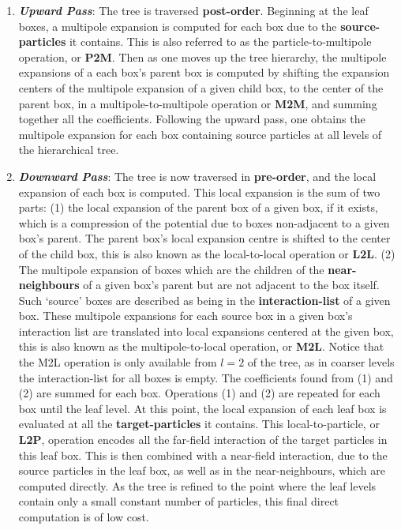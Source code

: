 \begin{enumerate}
    \item \textbf{\textit{Upward Pass}}: The tree is traversed \textbf{\gls{post-order}}.
    Beginning at the leaf boxes, a multipole expansion is computed for each box
    due to the \textbf{\gls{source-particles}} it contains. This is also referred to as the particle-to-multipole
    operation, or \textbf{\gls{P2M}}. Then as one moves up the tree hierarchy, the
    multipole expansions of a each box's parent box is computed by shifting the
    expansion centers of the multipole expansion of a given child box, to the center
    of the parent box, in a multipole-to-multipole operation or \textbf{\gls{M2M}},
    and summing together all the coefficients. Following the upward pass, one
    obtains the multipole expansion for each box containing source particles at
    all levels of the hierarchical tree.
    \item \textbf{\textit{Downward Pass}}: The tree is now traversed in
    \textbf{\gls{pre-order}}, and the local expansion of each box is computed.
    This local expansion is the sum of two parts: (1) the local expansion of the
    parent box of a given box, if it exists, which is a compression of the potential due to boxes
    non-adjacent to a given box's parent. The parent box's local expansion centre
    is shifted to the center of the child box, this is also known as the local-to-local
    operation or \textbf{\gls{L2L}}. (2) The multipole expansion of boxes which
    are the children of the \textbf{\gls{near-neighbours}} of a given box's
    parent but are not adjacent to the box itself. Such `source' boxes are described
    as being in the \textbf{\gls{interaction-list}} of a given box. These multipole
    expansions for each source box in a given box's interaction list are translated into local expansions centered at
    the given box, this is also known as
    the multipole-to-local operation, or \textbf{\gls{M2L}}. Notice that the
    \gls{M2L} operation is only available from $l=2$ of the tree, as in coarser
    levels the \gls{interaction-list} for all boxes is empty. The coefficients found
    from (1) and (2) are summed for each box. Operations (1) and (2) are repeated for each
    box until the leaf level. At this point, the local expansion
    of each leaf box is evaluated at all the \textbf{\gls{target-particles}} it contains.
    This local-to-particle, or \textbf{\gls{L2P}}, operation encodes all the \gls{far-field}
    interaction of the target particles in this leaf box. This is then combined with
    a \gls{near-field} interaction, due to the source particles in the leaf box,
    as well as in the \gls{near-neighbours}, which are computed directly. As the
    tree is refined to the point where the leaf levels contain only a small constant
    number of particles, this final direct computation is of low cost.
\end{enumerate}


